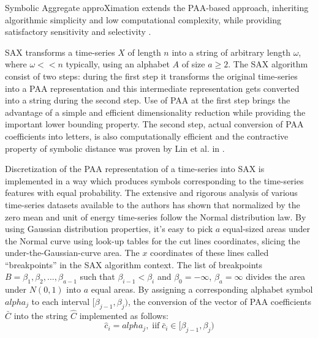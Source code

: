 \documentclass[conference]{IEEEtran}
\begin{document}
Symbolic Aggregate approXimation extends the PAA-based approach, inheriting algorithmic 
simplicity and low computational complexity, while providing satisfactory sensitivity and 
selectivity \cite{citeulike:2821475}. 

SAX transforms a time-series $X$ of length $n$ into a string of arbitrary length $\omega$, 
where $\omega << n$ typically, using an alphabet $A$ of size $ a \geq 2$. 
The SAX algorithm consist of two steps: during the first step it transforms the original time-series 
into a PAA representation and this intermediate representation gets converted into a string during the second step. 
Use of PAA at the first step brings the advantage of a simple and efficient dimensionality reduction while 
providing the important lower bounding property. 
The second step, actual conversion of PAA coefficients into letters, is also computationally efficient 
and the contractive property of symbolic distance was proven by Lin et al. in \cite{citeulike:532335}.

Discretization of the PAA representation of a time-series into SAX is implemented in a way which produces 
symbols corresponding to the time-series features with equal probability. The extensive and rigorous 
analysis of various time-series datasets available to the authors has shown that normalized by the zero 
mean and unit of energy time-series follow the Normal distribution law. By using Gaussian distribution 
properties, it's easy to pick $a$ equal-sized areas under the Normal curve using  look-up tables \cite{citeulike:4434481} 
for the cut lines coordinates, slicing the under-the-Gaussian-curve area. 
The $x$ coordinates of these lines called ``breakpoints'' in the SAX algorithm context. The 
list of breakpoints $B=\beta_{1}, \beta_{2}, ... , \beta_{a-1}$ such that 
$\beta_{i-1} < \beta_{i}$ and $\beta_{0} = -\infty$, $\beta_{a} = \infty$ 
divides the area under $N(0,1)$ into $a$ equal areas. 
By assigning a corresponding alphabet symbol $alpha_{j}$ to each interval $[\beta_{j-1},\beta_{j})$, 
the conversion of the vector of PAA coefficients $\bar{C}$ into the string $\hat{C}$ implemented as follows:
\begin{equation}
\hat{c}_{i} = alpha_{j}, \; \text{iif} \; \bar{c}_{i} \in [\beta_{j-1},\beta_{j})
\label{eq:alpha}
\end{equation}

\end{document}

